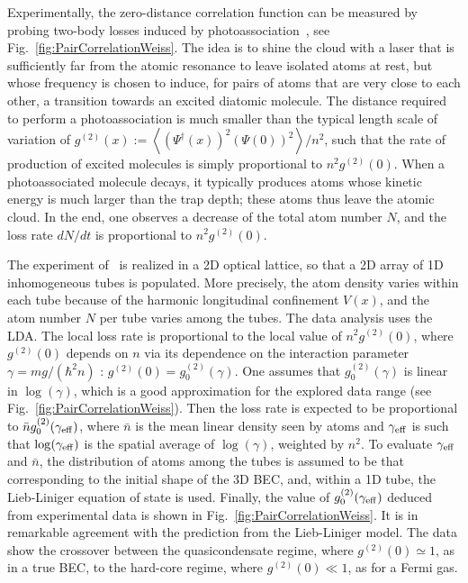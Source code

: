 \documentclass[onecolumn,amsfonts,showpacs,superscriptaddress]{revtex4-1}
\begin{document}
Experimentally, the zero-distance correlation
function can be measured by probing two-body losses
induced by photoassociation~\citep{kinoshita_local_2005}, see Fig.~\ref{fig:PairCorrelationWeiss}. The idea is to shine the cloud with
a laser that is sufficiently far from the atomic resonance to
leave isolated atoms at rest, but whose frequency is chosen to
 induce, for pairs of atoms that are very close to each other,
 a transition towards an excited diatomic molecule. The distance required to perform a photoassociation is much smaller than the typical
 length scale of variation of $g^{(2)}(x) := \left< (\Psi^\dagger(x))^2 (\Psi(0))^2 \right>/n^2$, such that 
 the rate of production of excited molecules is simply
 proportional to $n^2 g^{(2)}(0)$.
 When a photoassociated molecule decays, it typically produces atoms whose kinetic energy is much larger than the trap depth; these atoms thus leave the atomic cloud. In the end, one observes a decrease of the total atom number $N$, and the loss rate $dN/dt$ is proportional to $n^2 g^{(2)}(0)$.

The experiment of~\citep{kinoshita_local_2005} is realized in a 2D optical lattice, so that a 2D array of 1D
 inhomogeneous tubes is populated. More precisely, the atom density varies within each tube because of the harmonic longitudinal confinement $V(x)$, and the atom number $N$ per tube varies among the tubes. The data analysis uses the LDA. The local loss rate is proportional to the local value of $n^2 g^{(2)}(0)$, where $g^{(2)}(0)$ depends on $n$ via its dependence on the interaction parameter $\gamma=mg/(\hbar^2 n)$ :  $g^{(2)}(0)=g^{(2)}_0(\gamma)$.
One assumes that $g^{(2)}_0(\gamma)$
 is linear in $\log(\gamma)$, which is a good approximation for the  explored data range (see Fig.~\ref{fig:PairCorrelationWeiss}). 
 Then the loss rate is expected to be proportional to 
 $\bar{n}  g^{(2)}_0(\gamma_{\rm eff})$, where  $\bar{ n} $ is the mean linear density seen by atoms and
 $\gamma_{\rm eff}$ is such that 
 $\log(\gamma_{\rm eff})$ is the 
spatial average of $\log(\gamma)$, weighted by $n^2$.
 To evaluate $\gamma_{\rm eff}$ and $\bar{n}$,   the distribution of atoms
 among the tubes is assumed to be that corresponding to the initial  shape of the 3D BEC, and, within a 1D tube, the Lieb-Liniger equation of state is used.   
Finally, the value of $g^{(2)}_0(\gamma_{\rm eff})$ deduced from experimental data is shown in
 Fig.~\ref{fig:PairCorrelationWeiss}. It is in remarkable agreement
 with the prediction from the Lieb-Liniger model. The data show the crossover between the quasicondensate regime, where $g^{(2)}(0)\simeq 1$, as in a true BEC, to the hard-core regime, where $g^{(2)}(0) \ll 1$, as for a Fermi gas.
\end{document}
